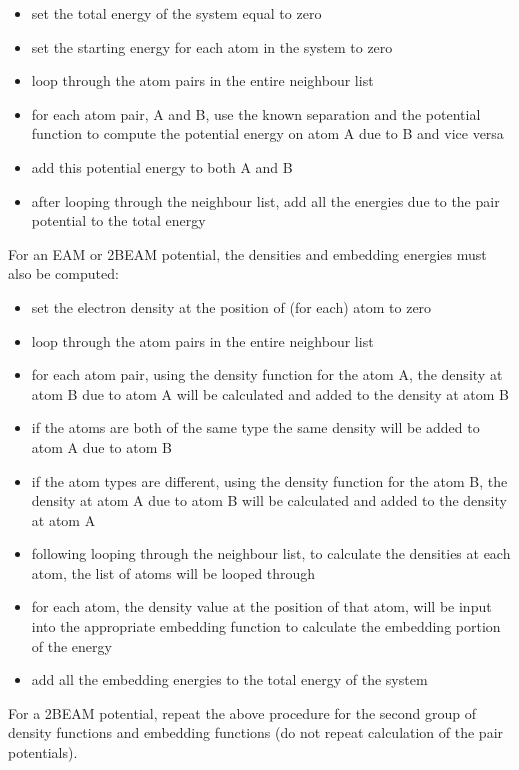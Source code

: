 \begin{itemize}
\item set the total energy of the system equal to zero
\item set the starting energy for each atom in the system to zero
\item loop through the atom pairs in the entire neighbour list
\item for each atom pair, A and B, use the known separation and the potential function to compute the potential energy on atom A due to B and vice versa
\item add this potential energy to both A and B
\item after looping through the neighbour list, add all the energies due to the pair potential to the total energy
\end{itemize}

For an EAM or 2BEAM potential, the densities and embedding energies must also be computed:

\begin{itemize}
\item set the electron density at the position of (for each) atom to zero
\item loop through the atom pairs in the entire neighbour list
\item for each atom pair, using the density function for the atom A, the density at atom B due to atom A will be calculated and added to the density at atom B
\item if the atoms are both of the same type the same density will be added to atom A due to atom B
\item if the atom types are different, using the density function for the atom B, the density at atom A due to atom B will be calculated and added to the density at atom A
\item following looping through the neighbour list, to calculate the densities at each atom, the list of atoms will be looped through
\item for each atom, the density value at the position of that atom, will be input into the appropriate embedding function to calculate the embedding portion of the energy
\item add all the embedding energies to the total energy of the system
\end{itemize}

For a 2BEAM potential, repeat the above procedure for the second group of density functions and embedding functions (do not repeat calculation of the pair potentials).


